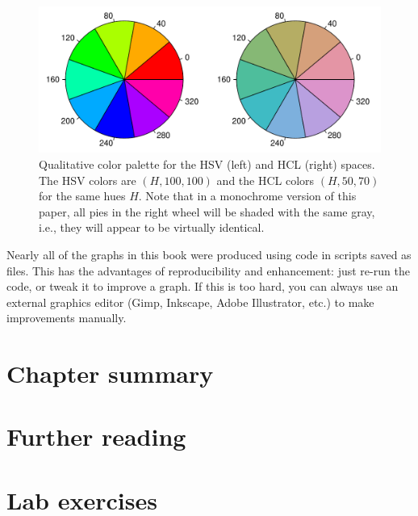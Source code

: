 \documentclass[10pt,krantz2]{krantz}\usepackage[]{graphicx}\usepackage[]{color}
\newenvironment{knitrout}{}{} %
\renewenvironment{knitrout}{\small\renewcommand{\baselinestretch}{.85}}{} %
\begin{document}
\begin{description}
\begin{knitrout}
\color{fgcolor}\begin{figure}[!htbp]

\centerline{\includegraphics[width=.8\textwidth]{ch01/fig/colors-1} }

\caption[Qualitative color palette for the HSV (left) and HCL (right) spaces]{Qualitative color palette for the HSV (left) and HCL (right) spaces. The HSV colors are $(H, 100, 100)$ and the HCL colors $(H, 50, 70)$ for the same hues $H$. Note that in a monochrome version of this paper, all pies in the right wheel will be shaded with the same gray, i.e., they will appear to be virtually identical.\label{fig:colors}}
\end{figure}


\end{knitrout}
 
\end{description}

Nearly all of the graphs in this book were produced using \R code in
scripts saved as files.  This has the advantages of reproducibility
and enhancement: just re-run the code, or tweak it to improve a graph.
If this is too hard, you can always use an external graphics editor
(Gimp, Inkscape, Adobe Illustrator, etc.) to make improvements manually.

\section{Chapter summary}


\section{Further reading}\label{sec:ch01-reading}


\section{Lab exercises}\label{sec:ch01-exercises}

\end{document}
